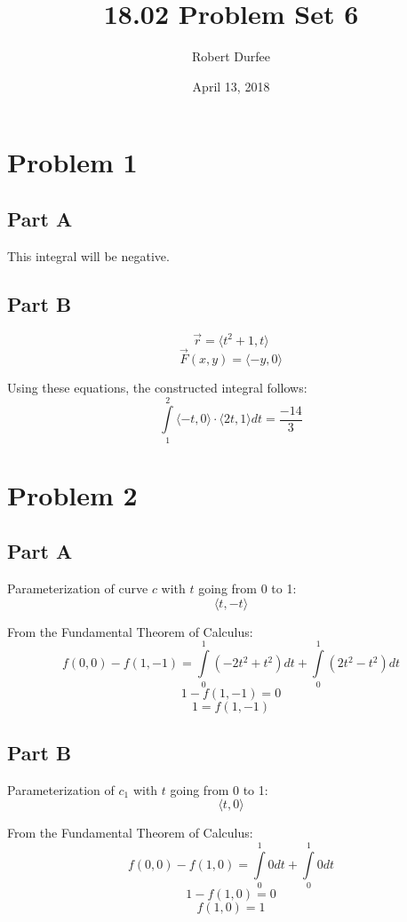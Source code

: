 \documentclass{article}
\title{ 18.02 Problem Set 6 }
\author{ Robert Durfee }
\date{ April 13, 2018 }
\begin{document}
\maketitle

\section*{Problem 1}

\subsection*{Part A}


This integral will be negative.

\subsection*{Part B}

$$\vec{r} = \langle t^2 + 1, t \rangle $$
$$\vec{F}(x, y) = \langle -y, 0 \rangle $$

Using these equations, the constructed integral follows:
$$\int\limits_1^2 \langle -t, 0 \rangle \cdot \langle 2t, 1 \rangle dt =
\frac{-14}{3} $$

\section*{Problem 2}

\subsection*{Part A}

Parameterization of curve $c$ with $t$ going from 0 to 1:
$$ \langle t, -t \rangle $$

From the Fundamental Theorem of Calculus:
$$ f(0, 0) - f(1, -1) = \int\limits_0^1 (-2t^2 + t^2) dt + \int\limits_0^1 (2t^2
- t^2) dt $$
$$ 1 - f(1, -1) = 0 $$
$$ 1 = f(1, -1) $$

\subsection*{Part B}

Parameterization of $c_1$ with $t$ going from 0 to 1:
$$ \langle t, 0 \rangle $$

From the Fundamental Theorem of Calculus:
$$ f(0, 0) - f(1, 0) = \int\limits_0^1 0 dt + \int\limits_0^1 0 dt $$
$$ 1 - f(1, 0) = 0 $$
$$ f(1, 0) = 1 $$
\end{document}
